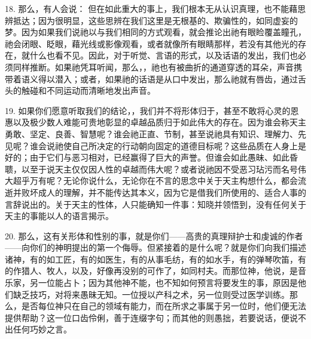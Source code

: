 18. 那么，有人会说： 但在如此重大的事上，我们根本无从认识真理，也不能藉思辨抵达；因为很明显，这些思辨在我们这里是无根基的、欺骗性的，如同虚妄的梦。因为如果我们说祂以与我们相同的方式观看，就会推论出祂有眼睑覆盖瞳孔，祂会闭眼、眨眼，藉光线或影像观看，或者就像所有眼睛那样，若没有其他光的存在，就什么也看不见。因此，对于听觉、言语的形式，以及话语的发出，我们也必须同样推断。如果祂凭耳听闻，那么，，祂也有被曲折的通道穿透的耳朵，声音携带着语义得以潜入；或者，如果祂的话语是从口中发出，那么祂就有唇齿，通过舌头的触碰和不同运动而清晰地发出声音。\par

19. 如果你们愿意听取我们的结论，，我们并不将形体归于，甚至不敢将心灵的恩惠以及极少数人难能可贵地彰显的卓越品质归于如此伟大的存在。因为谁会称天主勇敢、坚定、良善、智慧呢？谁会祂正直、节制，甚至说祂具有知识、理解力、先见呢？谁会说祂使自己所决定的行动朝向固定的道德目标呢？这些品质在人身上是好的；由于它们与恶习相对，已经赢得了巨大的声誉。但谁会如此愚昧、如此昏聩，以至于说天主仅仅因人性的卓越而伟大呢？或者说祂因不受恶习玷污而名号伟大超乎万有呢？无论你说什么，无论你在不言的思念中关于天主构想什么，都会流逝并败坏成人的理解，并不能传达其本义，因为它是借我们所使用的、适合人事的言辞说出的。关于天主的性体，人只能确知一件事：知晓并领悟到，没有任何关于天主的事能以人的语言揭示。\par

20. 那么，这有关形体和性别的事，就是你们——高贵的真理辩护士和虔诚的作者——向你们的神明提出的第一个侮辱。但紧接着的是什么呢？就是你们向我们描述诸神，有的如工匠，有的如医生，有的从事毛纺，有的如水手，有的弹琴吹笛，有的作猎人、牧人，以及，好像再没别的可作了，如同村夫。而那位神，他说，是音乐家，另一位能占卜；因为其他神不能，也不知如何预言将要发生的事，原因是他们缺乏技巧，对将来愚昧无知。一位授以产科之术，另一位则受过医学训练。那么，是否每位神只在自己的领域有能力，而在所求之事属于另一位时，他们便无法提供帮助？这一位口齿伶俐，善于连缀字句；而其他的则愚拙，若要说话，便说不出任何巧妙之言。\par

